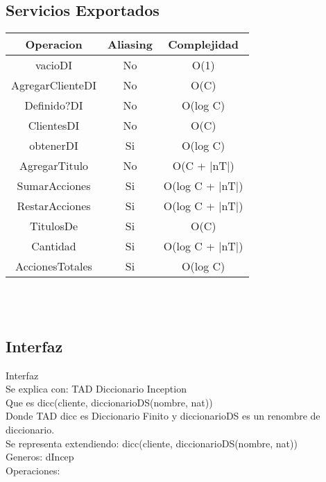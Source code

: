 \begin{tad}{}
\alinearaxiomas{}{}


\end{tad}

\subsection{Servicios Exportados}
	\begin{tabular}[c]{|c|c|c|}
		\hline
		Operacion & Aliasing & Complejidad \\
		\hline
		vacioDI & No &  O(1)\\
		\hline
		AgregarClienteDI & No &  O(C)\\
		\hline
		Definido?DI & No &  O(log C)\\
		\hline
		ClientesDI & No &  O(C)\\
		\hline
		obtenerDI & Si &  O(log C)\\
		\hline
		AgregarTitulo & No &  O(C + |nT|)\\
		\hline
		SumarAcciones & Si &  O(log C + |nT|)\\
		\hline
		RestarAcciones & Si &  O(log C + |nT|)\\
		\hline
		TitulosDe & Si &  O(C)\\
		\hline
		Cantidad & Si &  O(log C + |nT|)\\
		\hline
		AccionesTotales & Si &  O(log C)\\
		\hline
	\end{tabular}\\\\

	
\subsection{Interfaz}
	Interfaz \\
	Se explica con: TAD Diccionario Inception \\
	Que es dicc(cliente, diccionarioDS(nombre, nat))\\
	Donde TAD dicc es Diccionario Finito y diccionarioDS es un renombre de diccionario.\\
	Se representa extendiendo: dicc(cliente, diccionarioDS(nombre, nat))\\
	Generos: dIncep\\
	Operaciones:\\
	

